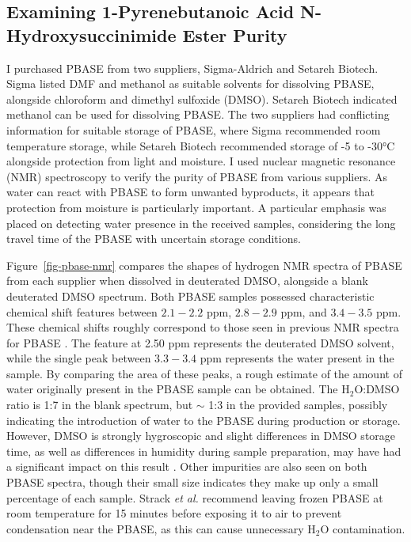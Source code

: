 \documentclass[
  a4paper,
]{scrbook}
\begin{document}
\hypertarget{sec-PBASE-purity}{%
\subsection{Examining 1-Pyrenebutanoic Acid N-Hydroxysuccinimide Ester
Purity}\label{sec-PBASE-purity}}

I purchased PBASE from two suppliers, Sigma-Aldrich and Setareh Biotech.
Sigma listed DMF and methanol as suitable solvents for dissolving PBASE,
alongside chloroform and dimethyl sulfoxide (DMSO). Setareh Biotech
indicated methanol can be used for dissolving PBASE. The two suppliers
had conflicting information for suitable storage of PBASE, where Sigma
recommended room temperature storage, while Setareh Biotech recommended
storage of -5 to -30°C alongside protection from light and moisture. I
used nuclear magnetic resonance (NMR) spectroscopy to verify the purity
of PBASE from various suppliers. As water can react with PBASE to form
unwanted byproducts, it appears that protection from moisture is
particularly important. A particular emphasis was placed on detecting
water presence in the received samples, considering the long travel time
of the PBASE with uncertain storage conditions.

Figure~\ref{fig-pbase-nmr} compares the shapes of hydrogen NMR spectra
of PBASE from each supplier when dissolved in deuterated DMSO, alongside
a blank deuterated DMSO spectrum. Both PBASE samples possessed
characteristic chemical shift features between \(2.1-2.2\) ppm,
\(2.8-2.9\) ppm, and \(3.4-3.5\) ppm. These chemical shifts roughly
correspond to those seen in previous NMR spectra for PBASE
\autocite{NMR2}. The feature at 2.50 ppm represents the deuterated DMSO
solvent, while the single peak between \(3.3-3.4\) ppm represents the
water present in the sample. By comparing the area of these peaks, a
rough estimate of the amount of water originally present in the PBASE
sample can be obtained. The H\(_{2}\)O:DMSO ratio is 1:7 in the blank
spectrum, but \(\sim\) 1:3 in the provided samples, possibly indicating
the introduction of water to the PBASE during production or storage.
However, DMSO is strongly hygroscopic and slight differences in DMSO
storage time, as well as differences in humidity during sample
preparation, may have had a significant impact on this result
\autocite{Lebel1962}. Other impurities are also seen on both PBASE
spectra, though their small size indicates they make up only a small
percentage of each sample. Strack \emph{et al.} \autocite{Strack2013}
recommend leaving frozen PBASE at room temperature for 15 minutes before
exposing it to air to prevent condensation near the PBASE, as this can
cause unnecessary H\(_2\)O contamination.
\end{document}
